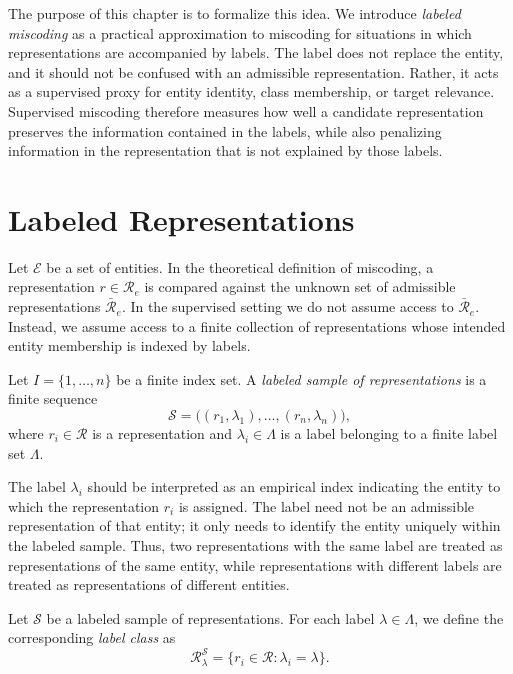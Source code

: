 The purpose of this chapter is to formalize this idea. We introduce \emph{labeled miscoding} as a practical approximation to miscoding for situations in which representations are accompanied by labels. The label does not replace the entity, and it should not be confused with an admissible representation. Rather, it acts as a supervised proxy for entity identity, class membership, or target relevance. Supervised miscoding therefore measures how well a candidate representation preserves the information contained in the labels, while also penalizing information in the representation that is not explained by those labels.

%
%

\section{Labeled Representations}
\label{sec:labeled_representations}

Let $\mathcal E$ be a set of entities. In the theoretical definition of miscoding, a representation $r \in \mathcal {R}_e$ is compared against the unknown set of admissible representations $\bar{\mathcal R}_e$. In the supervised setting we do not assume access to $\bar{\mathcal R}_e$. Instead, we assume access to a finite collection of representations whose intended entity membership is indexed by labels.

\begin{definition}
\label{def:labeled_sample}
Let \(I=\{1,\ldots,n\}\) be a finite index set. A \emph{labeled sample of representations} is a finite sequence
\[
\mathcal S = \big( (r_1, \lambda_1), \ldots, (r_n, \lambda_n) \big),
\]
where $r_i \in \mathcal{R}$ is a representation and $\lambda_i \in \Lambda$ is a label belonging to a finite label set $\Lambda$.
\end{definition}

The label $\lambda_i$ should be interpreted as an empirical index indicating the entity to which the representation $r_i$ is assigned. The label need not be an admissible representation of that entity; it only needs to identify the entity uniquely within the labeled sample. Thus, two representations with the same label are treated as representations of the same entity, while representations with different labels are treated as representations of different entities.

\begin{definition}
\label{def:label_class}
Let $\mathcal S$ be a labeled sample of representations. For each label $\lambda \in \Lambda$, we define the corresponding \emph{label class} as
\[
\mathcal {R}_{\lambda}^{\mathcal S} = \{r_i\in \mathcal{R} : \lambda_i = \lambda\}.
\]
\end{definition}

